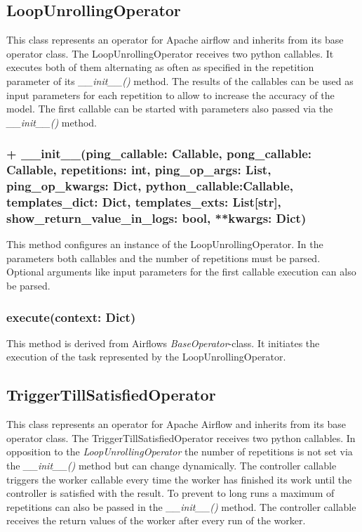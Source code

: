 \subsection{LoopUnrollingOperator}
This class represents an operator for Apache airflow and inherits from its base operator class.
The LoopUnrollingOperator receives two python callables. It executes both of them alternating as often as specified in the repetition parameter of its \textit{\_\_init\_\_()} method. The results of the callables can be used as input parameters for each repetition to allow to increase the accuracy of the model. The first callable can be started with parameters also passed via the \textit{\_\_init\_\_()} method.

\subsubsection{+  \_\_init\_\_(ping\_callable: Callable, pong\_callable: Callable, repetitions: int, ping\_op\_args: List, ping\_op\_kwargs: Dict, python\_callable:Callable, templates\_dict: Dict, templates\_exts: List[str], show\_return\_value\_in\_logs: bool, **kwargs: Dict)}

This method configures an instance of the LoopUnrollingOperator. In the parameters both callables and the number of repetitions must be parsed. Optional arguments like input parameters for the first callable execution can also be parsed.

\subsubsection{execute(context: Dict)} 
This method is derived from Airflows \textit{BaseOperator}-class. It initiates the execution of the task represented by the LoopUnrollingOperator.


\subsection{TriggerTillSatisfiedOperator}
This class represents an operator for Apache Airflow and inherits from its base operator class.
The TriggerTillSatisfiedOperator receives two python callables. In opposition to the \textit{LoopUnrollingOperator} the number of repetitions is not set via the \textit{\_\_init\_\_()} method but can change dynamically. The controller callable triggers the worker callable every time the worker has finished its work until the controller is satisfied with the result. To prevent to long runs a maximum of repetitions can also be passed in the \textit{\_\_init\_\_()} method. The controller callable receives the return values of the worker after every run of the worker.

